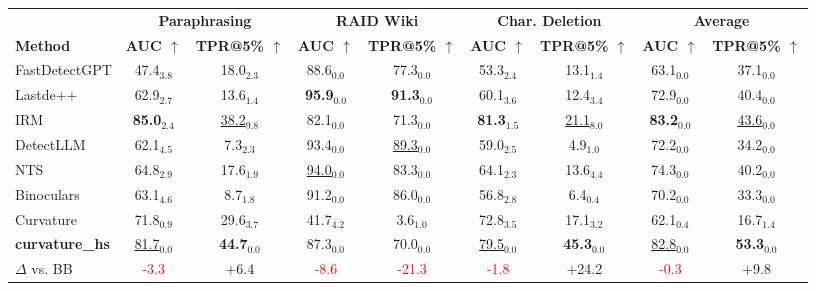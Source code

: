 \begin{tabular}{lcccccccc}
\toprule
 & \multicolumn{2}{c}{\textbf{Paraphrasing}} & \multicolumn{2}{c}{\textbf{RAID Wiki}} & \multicolumn{2}{c}{\textbf{Char. Deletion}} & \multicolumn{2}{c}{\textbf{Average}} \\
\cmidrule(lr){2-3} \cmidrule(lr){4-5} \cmidrule(lr){6-7} \cmidrule(lr){8-9}
\textbf{Method} & \textbf{AUC $\uparrow$} & \textbf{TPR@5\% $\uparrow$} & \textbf{AUC $\uparrow$} & \textbf{TPR@5\% $\uparrow$} & \textbf{AUC $\uparrow$} & \textbf{TPR@5\% $\uparrow$} & \textbf{AUC $\uparrow$} & \textbf{TPR@5\% $\uparrow$} \\
\midrule
FastDetectGPT & 47.4$_{3.8}$ & 18.0$_{2.3}$ & 88.6$_{0.0}$ & 77.3$_{0.0}$ & 53.3$_{2.4}$ & 13.1$_{1.4}$ & 63.1$_{0.0}$ & 37.1$_{0.0}$ \\
Lastde++ & 62.9$_{2.7}$ & 13.6$_{1.4}$ & \cellcolor{cyan!25}\textbf{95.9$_{0.0}$} & \cellcolor{cyan!25}\textbf{91.3$_{0.0}$} & 60.1$_{3.6}$ & 12.4$_{3.4}$ & 72.9$_{0.0}$ & 40.4$_{0.0}$ \\
IRM & \cellcolor{cyan!25}\textbf{85.0$_{2.4}$} & \cellcolor{orange!25}\underline{38.2$_{9.8}$} & 82.1$_{0.0}$ & 71.3$_{0.0}$ & \cellcolor{cyan!25}\textbf{81.3$_{1.5}$} & \cellcolor{orange!25}\underline{21.1$_{8.0}$} & \cellcolor{cyan!25}\textbf{83.2$_{0.0}$} & \cellcolor{orange!25}\underline{43.6$_{0.0}$} \\
DetectLLM & 62.1$_{4.5}$ & 7.3$_{2.3}$ & 93.4$_{0.0}$ & \cellcolor{orange!25}\underline{89.3$_{0.0}$} & 59.0$_{2.5}$ & 4.9$_{1.0}$ & 72.2$_{0.0}$ & 34.2$_{0.0}$ \\
NTS & 64.8$_{2.9}$ & 17.6$_{1.9}$ & \cellcolor{orange!25}\underline{94.0$_{0.0}$} & 83.3$_{0.0}$ & 64.1$_{2.3}$ & 13.6$_{4.4}$ & 74.3$_{0.0}$ & 40.2$_{0.0}$ \\
Binoculars & 63.1$_{4.6}$ & 8.7$_{1.8}$ & 91.2$_{0.0}$ & 86.0$_{0.0}$ & 56.8$_{2.8}$ & 6.4$_{0.4}$ & 70.2$_{0.0}$ & 33.3$_{0.0}$ \\
Curvature & 71.8$_{0.9}$ & 29.6$_{3.7}$ & 41.7$_{4.2}$ & 3.6$_{1.0}$ & 72.8$_{3.5}$ & 17.1$_{3.2}$ & 62.1$_{0.4}$ & 16.7$_{1.4}$ \\
\midrule
\textbf{curvature\_hs} & \cellcolor{orange!25}\underline{81.7$_{0.0}$} & \cellcolor{cyan!25}\textbf{44.7$_{0.0}$} & 87.3$_{0.0}$ & 70.0$_{0.0}$ & \cellcolor{orange!25}\underline{79.5$_{0.0}$} & \cellcolor{cyan!25}\textbf{45.3$_{0.0}$} & \cellcolor{orange!25}\underline{82.8$_{0.0}$} & \cellcolor{cyan!25}\textbf{53.3$_{0.0}$} \\
$\Delta$ vs. BB & \textcolor{red}{-3.3} & \textcolor{green!60!black}{+6.4} & \textcolor{red}{-8.6} & \textcolor{red}{-21.3} & \textcolor{red}{-1.8} & \textcolor{green!60!black}{+24.2} & \textcolor{red}{-0.3} & \textcolor{green!60!black}{+9.8} \\
\bottomrule
\end{tabular}
